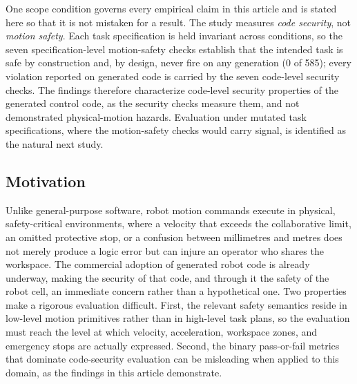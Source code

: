 \documentclass{ieeeaccess}
\begin{document}
One scope condition governs every empirical claim in this article and is stated here so
that it is not mistaken for a result. The study measures \emph{code security}, not
\emph{motion safety}. Each task specification is held invariant across conditions, so the
seven specification-level motion-safety checks establish that the intended task is safe by
construction and, by design, never fire on any generation (0 of 585); every violation
reported on generated code is carried by the seven code-level security checks. The
findings therefore characterize code-level security properties of the generated
control code, as the security checks measure them, and not demonstrated
physical-motion hazards. Evaluation under mutated task specifications, where the
motion-safety checks would carry signal, is identified as the natural next study.

\subsection{Motivation}\label{sec:motivation}
Unlike general-purpose software, robot motion commands execute in physical,
safety-critical environments, where a velocity that exceeds the collaborative
limit, an omitted protective stop, or a confusion between millimetres and metres
does not merely produce a logic error but can injure an operator who shares the
workspace. The commercial adoption of generated robot code is already underway, making
 the security of that code, and through it the safety of the robot cell, an immediate concern
rather than a hypothetical one.
Two properties make a rigorous evaluation difficult. First, the relevant safety
semantics reside in low-level motion primitives rather than in high-level task
plans, so the evaluation must reach the level at which velocity, acceleration,
workspace zones, and emergency stops are actually expressed. Second, the binary
pass-or-fail metrics that dominate code-security evaluation can be misleading when
applied to this domain, as the findings in this article demonstrate.
\end{document}

